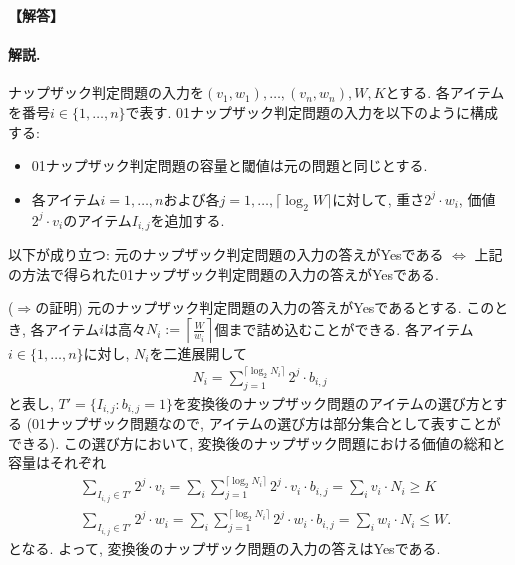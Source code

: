 \documentclass[12pt,a4paper]{article}
\newenvironment{solution}{
    \vspace{0.5em}
    \begin{tcolorbox}[colback=white, colframe=black, boxrule=1pt, arc=0mm, breakable]
    \noindent
    \textbf{【解答】}
    \vspace{0.3em}
}{
    \end{tcolorbox}
    \vspace{1em}
}
\begin{document}
\begin{solution}
\paragraph*{解説.}

ナップザック判定問題の入力を$(v_1,w_1),\dots,(v_n,w_n),W,K$とする.
各アイテムを番号$i\in\{1,\dots,n\}$で表す.
01ナップザック判定問題の入力を以下のように構成する:
\begin{itemize}
\item 01ナップザック判定問題の容量と閾値は元の問題と同じとする.
\item 各アイテム$i=1,\dots,n$および各$j=1,\dots,\lceil\log_2 W\rceil$に対して, 重さ$2^j \cdot w_i$, 価値$2^j \cdot v_i$のアイテム$I_{i,j}$を追加する.
\end{itemize}

以下が成り立つ: 元のナップザック判定問題の入力の答えがYesである $\iff$ 上記の方法で得られた01ナップザック判定問題の入力の答えがYesである.

($\Rightarrow$の証明) 元のナップザック判定問題の入力の答えがYesであるとする.
このとき, 各アイテム$i$は高々$N_i := \left\lceil \frac{W}{w_i} \right\rceil$個まで詰め込むことができる.
各アイテム $i\in\{1,\dots,n\}$に対し, $N_i$を二進展開して
\begin{align*}
    N_i = \sum_{j=1}^{\lceil\log_2 N_i\rceil} 2^j \cdot b_{i,j}
\end{align*}
と表し, $T'=\{I_{i,j} \colon b_{i,j}=1\}$を変換後のナップザック問題のアイテムの選び方とする (01ナップザック問題なので, アイテムの選び方は部分集合として表すことができる).
この選び方において, 変換後のナップザック問題における価値の総和と容量はそれぞれ
\begin{align*}
    &\sum_{I_{i,j}\in T'} 2^j\cdot v_i = \sum_i \sum_{j=1}^{\lceil\log_2 N_i\rceil} 2^j \cdot v_i \cdot b_{i,j} = \sum_i v_i \cdot N_i \ge K \\
    &\sum_{I_{i,j}\in T'} 2^j\cdot w_i = \sum_i \sum_{j=1}^{\lceil\log_2 N_i\rceil} 2^j \cdot w_i \cdot b_{i,j} = \sum_i w_i \cdot N_i \le W.
\end{align*}
となる. よって, 変換後のナップザック問題の入力の答えはYesである.



\end{solution}
\end{document}
